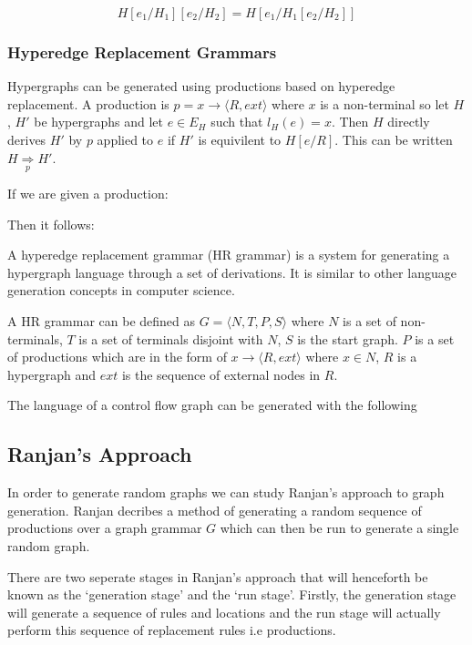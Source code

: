     \begin{equation}
    H[e_1/H_1][e_2/H_2] = H[e_1/H_1 [e_2/H_2]]
    \end{equation}

  \subsubsection{Hyperedge Replacement Grammars}

    Hypergraphs can be generated using productions based on hyperedge replacement. A production is $p = x \to \langle R, ext \rangle$ where $x$ is a non-terminal so let $H$, $H'$ be hypergraphs and let $e \in E_H$ such that $l_{H}(e) = x$. Then $H$ directly derives $H'$ by $p$ applied to $e$ if $H'$ is equivilent to $H[e / R]$. This can be written $H \underset{p}{\Rightarrow} H'$.

    If we are given a production:
    

    Then it follows:
    

    A hyperedge replacement grammar (HR grammar) is a system for generating a hypergraph language through a set of derivations. It is similar to other language generation concepts in computer science.

    A HR grammar can be defined as $G = \langle N, T, P, S \rangle$ where $N$ is a set of non-terminals, $T$ is a set of terminals disjoint with $N$, $S$ is the start graph. $P$ is a set of productions which are in the form of $x \to \langle R, ext \rangle$ where $x \in N$, $R$ is a hypergraph and $ext$ is the sequence of external nodes in $R$.

    The language of a control flow graph can be generated with the following
    

\subsection{Ranjan's Approach}
  In order to generate random graphs we can study Ranjan's approach to graph generation. Ranjan\cite{Ranjan} decribes a method of generating a random sequence of productions over a graph grammar $G$ which can then be run to generate a single random graph.

  There are two seperate stages in Ranjan's approach that will henceforth be known as the `generation stage' and the `run stage'. Firstly, the generation stage will generate a sequence of rules and locations and the run stage will actually perform this sequence of replacement rules i.e productions.

